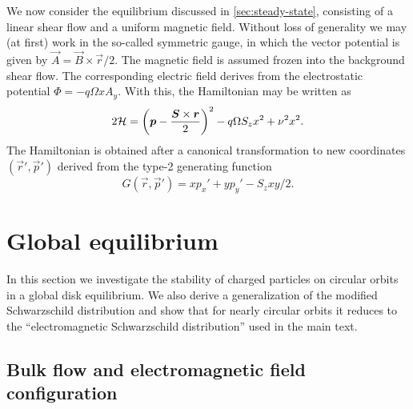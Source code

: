 \documentclass[aps,pre,notitlepage,amsmath,amssymb,amsfonts,nobibnotes,nofootinbib,superscriptaddress]{revtex4-1}
\begin{document}
We now consider the equilibrium discussed in \cref{sec:steady-state},
consisting of a linear shear flow and a uniform magnetic field. Without loss
of generality we may (at first) work in the so-called symmetric gauge, in
which the vector potential is given by $\vec{A}=\vec{B}\times\vec{r}/2$. The
magnetic field is assumed frozen into the background shear flow. The
corresponding electric field derives from the electrostatic potential
$\Phi=-q\Omega{}xA_y$. With this, the Hamiltonian may be written as
\begin{equation}
  \label{eq:shearing-sheet-hamiltonian}
  2\mathcal{H} = {\left(
    \vec{p} - \frac{\vec{S}\times\vec{r}}{2}
  \right)}^2 - q\Omega S_z x^2 + \vfreq^2 x^2.
\end{equation}
The Hamiltonian  is obtained after a canonical
transformation to new coordinates $(\vec{r}',\vec{p}')$ derived from the
type-2 generating function
\begin{equation}
  G(\vec{r},\vec{p}') = xp_x' + yp_y' - S_z xy/2.
\end{equation}

\section{Global equilibrium}
\label{app:global}

In this section we investigate the stability of charged particles on circular
orbits in a global disk equilibrium. We also derive a generalization of the
modified Schwarzschild distribution \citep{Shu1969} and show that for nearly
circular orbits it reduces to the ``electromagnetic Schwarzschild
distribution'' used in the main text.

\subsection{Bulk flow and electromagnetic field configuration}
\end{document}
